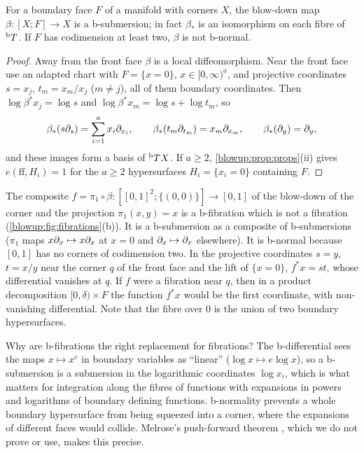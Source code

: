 \begin{proposition}\label{blowup:prop:bd-bsub}
For a boundary face $F$ of a manifold with corners $X$, the blow-down map
$\beta:[X;F]\to X$ is a b-submersion; in fact $\beta_*$ is an isomorphism on each fibre of
${}^{\mathrm{b}}T$. If $F$ has codimension at least two, $\beta$ is not b-normal.
\end{proposition}
\begin{proof}
Away from the front face $\beta$ is a local diffeomorphism. Near the front face use an
adapted chart with $F=\{x=0\}$, $x\in[0,\infty)^a$, and projective coordinates
$s=x_j$, $t_m=x_m/x_j$ ($m\ne j$), all of them boundary coordinates. Then
$\log\beta^*x_j=\log s$ and $\log\beta^*x_m=\log s+\log t_m$, so
\begin{equation*}
  \beta_*(s\partial_s)=\sum_{i=1}^ax_i\partial_{x_i},\qquad\beta_*(t_m\partial_{t_m})=x_m\partial_{x_m},\qquad
  \beta_*(\partial_{y})=\partial_y,
\end{equation*}
and these images form a basis of ${}^{\mathrm{b}}T X$. If $a\ge2$, \cref{blowup:prop:props}(ii) gives
$e(\mathrm{ff},H_i)=1$ for the $a\ge2$ hypersurfaces $H_i=\{x_i=0\}$ containing $F$.
\end{proof}

\begin{example}\label{blowup:exa:bfib}
The composite $f=\pi_1\circ\beta:[[0,1]^2;\{(0,0)\}]\to[0,1]$ of the blow-down of the corner
and the projection $\pi_1(x,y)=x$ is a b-fibration which is not a fibration
(\cref{blowup:fig:fibrations}(b)). It is a b-submersion as a composite of b-submersions
($\pi_1$ maps $x\partial_x\mapsto x\partial_x$ at $x=0$ and $\partial_x\mapsto\partial_x$ elsewhere). It is
b-normal because $[0,1]$ has no corners of codimension two. In the projective coordinates
$s=y$, $t=x/y$ near the corner $q$ of the front face and the lift of $\{x=0\}$,
$f^*x=st$, whose differential vanishes at $q$. If $f$ were a fibration near $q$, then in a
product decomposition $[0,\delta)\times F$ the function $f^*x$ would be the first coordinate,
with non-vanishing differential. Note that the fibre over $0$ is the union of two boundary
hypersurfaces.
\end{example}

\begin{discussion}
Why are b-fibrations the right replacement for fibrations? The b-differential sees the
maps $x\mapsto x^e$ in boundary variables as ``linear'' ($\log x\mapsto e\log x$), so a
b-submersion is a submersion in the logarithmic coordinates $\log x_i$, which is what
matters for integration along the fibres of functions with expansions in powers and logarithms
of boundary defining functions. b-normality prevents a whole boundary hypersurface from
being squeezed into a corner, where the expansions of different faces would collide.
Melrose's push-forward theorem \cite{Melrose-pushforward}, which we do not prove or use, makes this precise.
\end{discussion}

